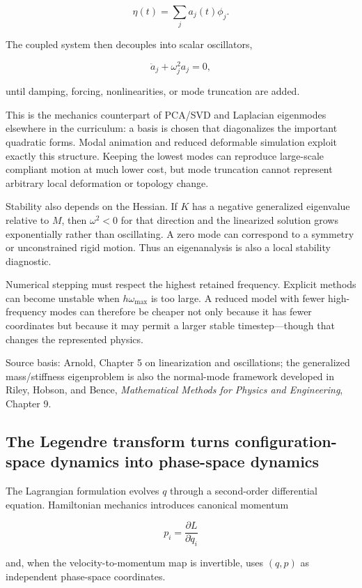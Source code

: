 \[
\eta(t)=\sum_j a_j(t)\phi_j.
\]

The coupled system then decouples into scalar oscillators,

\[
\ddot a_j+\omega_j^2a_j=0,
\]

until damping, forcing, nonlinearities, or mode truncation are added.

This is the mechanics counterpart of PCA/SVD and Laplacian eigenmodes elsewhere in the curriculum: a basis is chosen that diagonalizes the important quadratic forms. Modal animation and reduced deformable simulation exploit exactly this structure. Keeping the lowest modes can reproduce large-scale compliant motion at much lower cost, but mode truncation cannot represent arbitrary local deformation or topology change.

Stability also depends on the Hessian. If \(K\) has a negative generalized eigenvalue relative to \(M\), then \(\omega^2<0\) for that direction and the linearized solution grows exponentially rather than oscillating. A zero mode can correspond to a symmetry or unconstrained rigid motion. Thus an eigenanalysis is also a local stability diagnostic.

Numerical stepping must respect the highest retained frequency. Explicit methods can become unstable when \(h\omega_{\max}\) is too large. A reduced model with fewer high-frequency modes can therefore be cheaper not only because it has fewer coordinates but because it may permit a larger stable timestep---though that changes the represented physics.

Source basis: Arnold, Chapter 5 on linearization and oscillations; the generalized mass/stiffness eigenproblem is also the normal-mode framework developed in Riley, Hobson, and Bence, \emph{Mathematical Methods for Physics and Engineering}, Chapter 9.

\subsection{The Legendre transform turns configuration-space dynamics into phase-space dynamics}\label{02-foundations-ii-ch039-the-legendre-transform-turns-configuration-space-dynamics-into-phase-space-dynamics}

The Lagrangian formulation evolves \(q\) through a second-order differential equation. Hamiltonian mechanics introduces canonical momentum

\[
p_i
=
\frac{\partial L}{\partial\dot q_i}
\]

and, when the velocity-to-momentum map is invertible, uses \((q,p)\) as independent phase-space coordinates.

